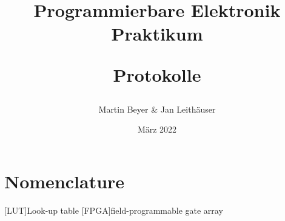 \documentclass[a4paper, 12pt]{book}
\begin{document}
\setcounter{page}{1}


\author{Martin Beyer \& Jan Leithäuser}
\title{
	Programmierbare Elektronik Praktikum
	
	Protokolle
}
\date{März 2022}

\frontmatter
\maketitle
\tableofcontents

\newpage
\section*{Nomenclature}
\begin{acronym}
	
	[LUT]{Look-up table}
	[FPGA]{field-programmable gate array}
	
\end{acronym}



\mainmatter








%

\backmatter
\end{document}
